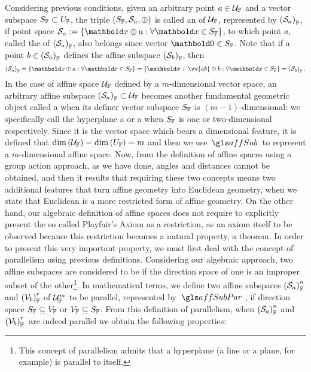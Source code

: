 Considering previous conditions, given an arbitrary point $a\in \eam{U}{F}$ and a vector subspace $S_\cam{F}\subset U_\cam{F}$, the triple $(S_\cam{F},\epu{S}_a,\oplus)$ is called an  of $\eam{U}{F}$, represented by $\eams{S}{F}{a}$, if point space $\epu{S}_a:=\{\vto{x}\oplus a:\forall \vto{x}\in S_\cam{F}\}$, to which point $a$, called the \index of $\eams{S}{F}{a}$, also belongs since vector $\vto{0}\in S_\cam{F}$. Note that if a point $b\in\eams{S}{F}{a}$ defines the affine subspace $\eams{S}{F}{b}$, then 
\begin{equation}\label{eq:igualAff}
\eams{S}{F}{a}=\{\vto{x}\oplus a:\forall \vto{x}\in S_\cam{F}\}=\{\vto{x}+\vv{ab}\oplus b:\forall \vto{x}\in S_\cam{F}\}=\eams{S}{F}{b}\,.
\end{equation}
In the case of affine space $\eam{U}{F}$ defined by a $m$-dimensional vector space, an arbitrary affine  subspace $\eams{S}{F}{a}\subset\eam{U}{F}$ becomes another fundamental geometric object called a  when its definer vector subspace $S_\cam{F}$ is $(m-1)$-dimensional: we specifically call the hyperplane a  or a  when $S_\cam{F}$ is one or two-dimensional respectively. Since it is the vector space which bears a dimensional feature, it is defined that $\dim{(\eam{U}{F})}=\dim{(U_\cam{F})}=m$ and then we use $\gloref{affSub}$ to represent a $m$-dimensional affine space. Now, from the definition of affine spaces using a group action approach, as we have done, angles and distances cannot be obtained, and then it results that requiring these two concepts means two additional features that turn affine geometry into Euclidean geometry, when we state that Euclidean is a more restricted form of affine geometry. On the other hand, our algebraic definition of affine spaces does not require to explicitly present the so called Playfair's Axiom as a restriction, as an axiom itself to be observed because this restriction becomes a natural property, a theorem. In order to present this very important property, we must first deal with the concept of parallelism using previous definitions. Considering our algebraic approach, two affine subspaces are considered to be  if the direction space of one is an improper subset of the other\footnote{This concept of parallelism admits that a hyperplane (a line or a plane, for example) is parallel to itself.}. In mathematical terms, we define two affine subspaces $\eamsd{S}{F}{a}{n}$ and $\eamsd{V}{F}{b}{r}$ of $\eamd{U}{F}{m}$ to be parallel, represented by $\gloref{affSubPar}\,$, if direction space $S_\cam{F}\subseteq V_\cam{F}$ or $V_\cam{F}\subseteq S_\cam{F}$. From this definition of parallelism, when $\eamsd{S}{F}{a}{n}$ and $\eamsd{V}{F}{b}{r}\,$ are indeed parallel we obtain the following properties:
